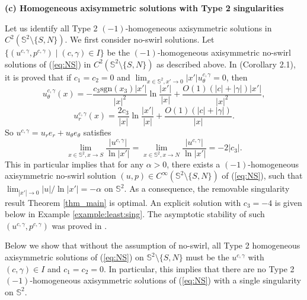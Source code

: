 \documentclass[12pt]{article}
\newcommand{\bS}{\mathbb{S}}
\begin{document}
\medskip

\noindent\textbf{(c) Homogeneous axisymmetric solutions with Type 2 singularities} 

Let us identify all Type 2 $(-1)$-homogeneous axisymmetric solutions in $C^2(\bS^2\setminus\{S, N\})$. We first consider no-swirl solutions. Let $\{(u^{c, \gamma}, p^{c, \gamma})\mid (c, \gamma)\in I\}$ be the $(-1)$-homogeneous axisymmetric no-swirl solutions of (\ref{eq:NS}) in $C^2(\bS^2\setminus\{S, N\})$ as described above. In \cite{LY} (Corollary 2.1), it is proved that if $c_1=c_2=0$ and $\lim_{x\in\mathbb{S}^2,x'\to 0} |x'|u_{\theta}^{c,\gamma} = 0$, then 
\begin{equation*}
	u^{c,\gamma}_{\theta}(x)=-\frac{c_3\mathrm{sgn}(x_3)|x'|}{|x|^2}\ln \frac{|x'|}{|x|}+\frac{O(1)(|c|+|\gamma|)|x'|}{|x|^2}, 
\end{equation*}
\begin{equation*}
	u^{c,\gamma}_{r}(x)=\frac{2c_3}{|x|}\ln\frac{|x'|}{|x|}+\frac{O(1)(|c|+|\gamma|)}{|x|}.
\end{equation*}
So $u^{c,\gamma}=u_re_r+u_{\theta}e_{\theta}$ satisfies 
\begin{equation}\label{eq:limit}
	\lim_{x\in \mathbb{S}^2, x\to S}\frac{|u^{c,\gamma}|}{\ln |x'|}= \lim_{x\in \mathbb{S}^2, x\to N}\frac{|u^{c,\gamma}|}{\ln |x'|}=-2|c_3|. 
\end{equation}
This in particular implies that for any $\alpha>0$, there exists a $(-1)$-homogeneous axisymmetric no-swirl solution $(u, p)\in C^{\infty}(\mathbb{S}^2\setminus\{S, N\})$ of (\ref{eq:NS}), such that $\lim_{|x'|\to 0}|u|/\ln |x'|=-\alpha$ on $\mathbb{S}^2$. As a consequence, the removable singularity result Theorem \ref{thm_main} is optimal. An explicit solution with $c_3=-4$ is given below in Example \ref{example:least:sing}. The asymptotic stability of such $(u^{c,\gamma}, p^{c, \gamma})$ was proved in \cite{LY}. 

Below we show that without the assumption of no-swirl, all Type 2 homogeneous axisymmetric solutions of (\ref{eq:NS}) on $\mathbb{S}^2\setminus\{S, N\}$ must be the $u^{c, \gamma}$ with $(c, \gamma)\in I$ and $c_1=c_2=0$. In particular, this implies that there are no Type 2 $(-1)$-homogeneous axisymmetric solutions of (\ref{eq:NS}) with a single singularity on $\mathbb{S}^2$. 
\end{document}
